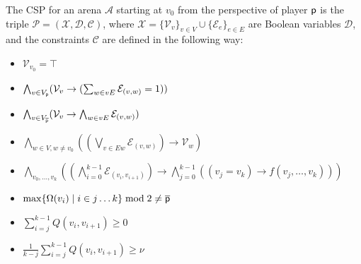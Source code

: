 \documentclass[a4paper,UKenglish,cleveref, autoref, thm-restate]{lipics-v2021}
\begin{document}
\begin{definition}\label{def:csp}
    The CSP for an arena $\mathcal{A}$
    starting at $v_0$ from the perspective of player $\mathsf{p}$ is the triple $\mathcal{P} = (\mathcal{X}, \mathcal{D}, \mathcal{C})$, where $\mathcal{X} = \{ \mathcal{V}_v \}_{v \in V} \cup \{ \mathcal{E}_e \}_{e \in E}$ are Boolean variables $\mathcal{D}$, and the constraints $\mathcal{C}$ are defined in the following way:
    \begin{itemize}
        [leftmargin=3.3cm, labelwidth=2.8cm, align=right, itemsep=0.2ex, parsep=0pt, topsep=2pt]

        \item [$\mathcal{C}_{v_0}$ :] $\mathcal{V}_{v_0} = \top$

        \item [$\mathcal{C}_{\player}$ :] $\bigwedge_{v \in V_{\mathsf{p}}} (\mathcal{V}_v \rightarrow (\sum_{w \in vE} \mathcal{E}_{(v,w)}= 1))$

        \item [$\mathcal{C}_{\opponent}$ :] $\bigwedge_{v \in V_{\overline{\mathsf{p}}}} (\mathcal{V}_v \rightarrow \bigwedge_{w \in vE} \mathcal{E}_{(v,w)})$

        \item [$\mathcal{C}_{\!E}$ :] $\bigwedge_{w \in V, w \neq v_0} ((\bigvee_{v \in Ew} \mathcal{E}_{(v,w)}) \rightarrow \mathcal{V}_w)$

        \item [$\mathcal{C}_{NOC}(f)$ :] $\bigwedge_{v_0, \dots, v_k} \left( \left(\bigwedge_{i=0}^{k-1} \mathcal{E}_{(v_i,v_{i+1})}\right) \to \bigwedge_{j=0}^{k-1} ((v_j = v_k) \to f(v_j, \dots, v_k)) \right)$

    \end{itemize}
    \begin{itemize}
        [leftmargin=3.3cm, labelwidth=2.8cm, align=right, itemsep=0.5ex, parsep=0pt, topsep=1pt]
        \item [$f_\omega(v_j, \dots, v_k) =$] $\max\{\Omega(v_i) \mid i\in j\dots k\} \bmod 2 \ne \overline{\mathsf{p}}$

        \item [$f_\eta(v_j, \dots, v_k) =$] $\sum_{i=j}^{k-1} Q(v_i, v_{i+1}) \ge 0$

        \item [$f_\mu(v_j, \dots, v_k) =$] $\frac{1}{k-j} \sum_{i=j}^{k-1} Q(v_i, v_{i+1}) \ge \nu$
    \end{itemize}
\end{definition}
\end{document}
